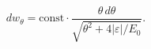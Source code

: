 \par\begin{equation}
 dw_\theta=\mathrm{const}\cdot
 \frac{\theta\,d\theta}{\sqrt{\theta^2+4|\varepsilon|/E_0}}.
 \tag{146.5}
\end{equation}
